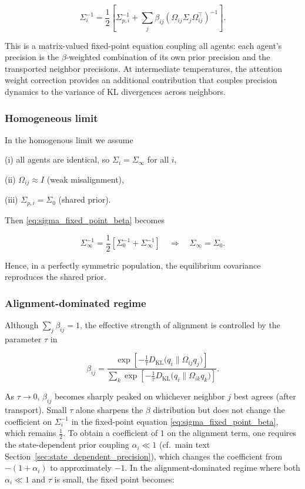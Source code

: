 \documentclass[twoside,11pt]{article}
\begin{document}
\begin{equation}
\Sigma_i^{-1}
=\frac{1}{2}
\left[
\Sigma_{p,i}^{-1}
+ \sum_j \beta_{ij}
(\Omega_{ij}\Sigma_j\Omega_{ij}^\top)^{-1}
\right].
\label{eq:sigma_fixed_point_beta}
\end{equation}

This is a matrix-valued fixed-point equation coupling all agents: each agent's precision is the $\beta$-weighted combination of its own prior precision and the transported neighbor precisions. At intermediate temperatures, the attention weight correction provides an additional contribution that couples precision dynamics to the variance of KL divergences across neighbors.

\subsubsection{Homogeneous limit}

In the homogenous limit we assume

(i) all agents are identical, so $\Sigma_i = \Sigma_\infty$ for all $i$,

(ii) $\Omega_{ij} \approx I$ (weak misalignment),

(iii) $\Sigma_{p,i} = \Sigma_0$ (shared prior).

Then \eqref{eq:sigma_fixed_point_beta} becomes

\begin{equation}
\Sigma_\infty^{-1}
=\frac{1}{2}
\left[
\Sigma_0^{-1}
+ \Sigma_\infty^{-1}
\right]
\quad\Longrightarrow\quad
\Sigma_\infty = \Sigma_0.
\end{equation}

Hence, in a perfectly symmetric population, the equilibrium covariance reproduces the shared prior.

\subsubsection{Alignment-dominated regime}

Although $\sum_j \beta_{ij} = 1$, the effective strength of alignment is controlled by the parameter $\tau$ in

\begin{equation}
\beta_{ij}
=\frac{
\exp \left[
-\frac{1}{\tau}
D_{\mathrm{KL}} \big(q_i \| \Omega_{ij} q_j\big)
\right]
}{\sum_k
\exp \left[
-\frac{1}{\tau}
D_{\mathrm{KL}} \big(q_i \| \Omega_{ik} q_k\big)
\right]}.
\end{equation}

As $\tau \to 0$, $\beta_{ij}$ becomes sharply peaked on whichever neighbor $j$ best agrees (after transport). Small $\tau$ alone sharpens the $\beta$ distribution but does not change the coefficient on $\Sigma_i^{-1}$ in the fixed-point equation \eqref{eq:sigma_fixed_point_beta}, which remains $\frac{1}{2}$. To obtain a coefficient of $1$ on the alignment term, one requires the state-dependent prior coupling $\alpha_i \ll 1$ (cf.\ main text Section~\ref{sec:state_dependent_precision}), which changes the coefficient from $-(1+\alpha_i)$ to approximately $-1$. In the alignment-dominated regime where both $\alpha_i \ll 1$ and $\tau$ is small, the fixed point becomes:
\end{document}
